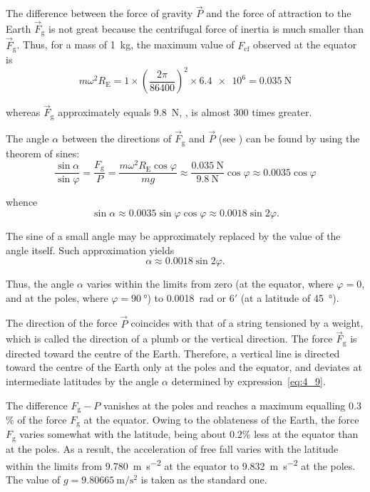 The difference between the force of gravity $\vec{P}$ and the force of attraction to the Earth $\vec{F}_{\text{g}}$ is not great because the centrifugal force of inertia is much smaller than $\vec{F}_{\text{g}}$. Thus, for a mass of \SI{1}{\kilo\gram}, the maximum value of $F_{\text{cf}}$ observed at the equator is
\begin{equation*}
m\omega^2 R_{\text{E}} = 1 \times \left(\frac{2\pi}{86400}\right)^2 \times \num{6.4e6} = \SI{0.035}{\newton}
\end{equation*}

\noindent
whereas $\vec{F}_{\text{g}}$ approximately equals \SI{9.8}{\newton}, \ie, is almost $300$ times greater.

The angle $\alpha$ between the directions of $\vec{F}_{\text{g}}$ and $\vec{P}$ (see ) can be found by using the theorem of sines:
\begin{equation*}
\frac{\sin\alpha}{\sin\varphi} = \frac{F_{\text{g}}}{P} = \frac{m\omega^2 R_{\text{E}}\cos\varphi}{mg} \approx \frac{\SI{0.035}{\newton}}{\SI{9.8}{\newton}} \cos\varphi \approx 0.0035 \cos\varphi
\end{equation*}

\noindent
whence
\begin{equation*}
\sin\alpha \approx 0.0035\sin\varphi\cos\varphi \approx 0.0018 \sin 2\varphi.
\end{equation*}

\noindent
The sine of a small angle may be approximately replaced by the value of the angle itself. Such approximation yields
\begin{equation}\label{eq:4_9}
\alpha \approx 0.0018 \sin 2\varphi.
\end{equation}

\noindent
Thus, the angle $\alpha$ varies within the limits from zero (at the equator, where $\varphi=0$, and at the poles, where $\varphi=\SI{90}{\degree}$) to \SI{0.0018}{\radian} or $6'$ (at a latitude of \SI{45}{\degree}).

The direction of the force $\vec{P}$ coincides with that of a string tensioned by a weight, which is called the direction of a plumb or the vertical direction. The force $\vec{F}_{\text{g}}$ is directed toward the centre of the Earth. Therefore, a vertical line is directed toward the centre of the Earth only at the poles and the equator, and deviates at intermediate latitudes by the angle $\alpha$ determined by expression~\eqref{eq:4_9}.

The difference $F_{\text{g}}-P$ vanishes at the poles and reaches a maximum equalling $0.3$\% of the force $F_{\text{g}}$ at the equator. Owing to the oblateness of the Earth, the force $F_{\text{g}}$ varies somewhat with the latitude, being about $0.2$\% less at the equator than at the poles. As a result, the acceleration of free fall varies with the latitude within the limits from \SI{9.780}{\metre\per\square\second} at the equator to \SI{9.832}{\metre\per\square\second} at the poles. The value of $g=\SI{9.80665}{\metre\per\square\second}$ is taken as the standard one.

